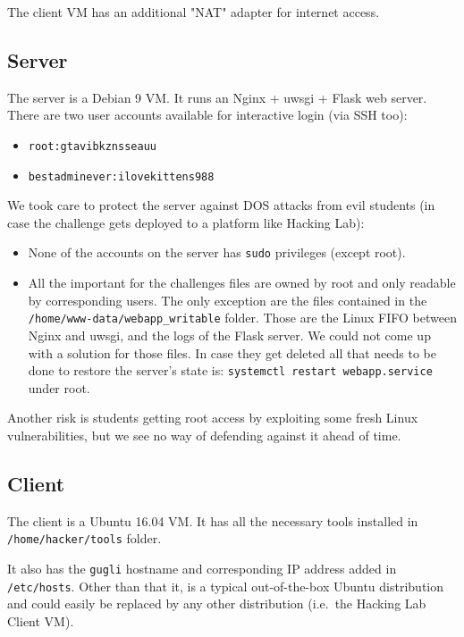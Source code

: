 \documentclass[11pt, a4paper]{article}
\begin{document}
  The client VM  has an additional "NAT" adapter for internet access.

\subsection{Server}
  The server is a Debian 9 VM. It runs an Nginx + uwsgi + Flask web server.
  There are two user accounts available for interactive login (via SSH too):
  \begin{itemize}
    \item \texttt{root:gtavibkznsseauu}
    \item \texttt{bestadminever:ilovekittens988}
  \end{itemize}

  We took care to protect the server against DOS attacks from evil students (in
  case the challenge gets deployed to a platform like Hacking Lab):
  \begin{itemize}
    \item None of the accounts on the server has \texttt{sudo} privileges (except root).
    \item All the important for the challenges files are owned by root and only
      readable by corresponding users. The only exception are the files contained
      in the \texttt{/home/www-data/webapp\_writable} folder. Those are the
      Linux FIFO between Nginx and uwsgi, and the logs of the Flask server. We could
      not come up with a solution for those files. In case they get deleted
      all that needs to be done to restore the server's state is:
      \texttt{systemctl restart webapp.service} under root.
  \end{itemize}

  Another risk is students getting root access by exploiting some fresh Linux
  vulnerabilities, but we see no way of defending against it ahead of time.

\subsection{Client}
  The client is a Ubuntu 16.04 VM. It has all the necessary tools installed in
  \texttt{/home/hacker/tools} folder.

  It also has the \texttt{gugli} hostname and corresponding IP address added in \texttt{/etc/hosts}. Other than
  that it, is a typical out-of-the-box Ubuntu distribution and could easily be replaced
  by any other distribution (i.e.~the Hacking Lab Client VM).
\end{document}
